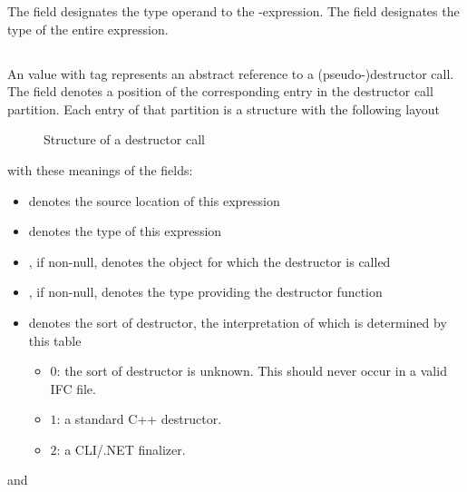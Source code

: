 The field  designates the type operand to the -expression.
The field  designates the type of the entire expression.



\subsection{}
\label{sec:ifc:ExprSort:DestructorCall}

An  value with tag  represents an abstract reference to 
a (pseudo-)destructor call.  The  field denotes a position of the corresponding entry in the destructor call partition.
Each entry of that partition is a structure with the following layout
%
\begin{figure}[H]
	\centering
	\caption{Structure of a destructor call}
	\label{fig:ifc-destructor-call-structure}
\end{figure}
%
with these meanings of the fields:
\begin{itemize}
	\item {} denotes the source location of this expression
	\item {} denotes the type of this expression
	\item {}, if non-null, denotes the object for which the destructor is called
	\item {}, if non-null, denotes the type providing the destructor function
	\item {} denotes the sort of destructor, the interpretation of which is determined by this table 
	\begin{itemize}
		\item $0$: the sort of destructor is unknown.  This should never occur in a valid IFC file.
		\item $1$: a standard C++ destructor.
		\item $2$: a CLI/.NET finalizer.
	\end{itemize}
\end{itemize}
and 

